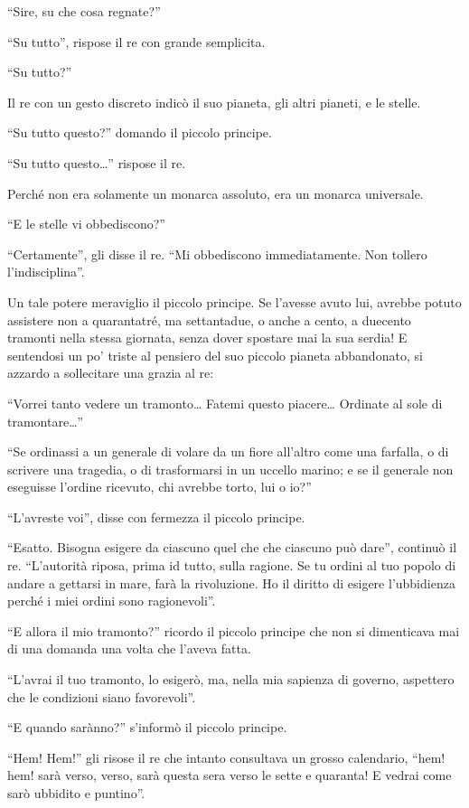\documentclass[11pt]{scrbook}
\begin{document}
``Sire, su che cosa regnate?''

``Su tutto'', rispose il re con grande semplicita.

``Su tutto?''

Il re con un gesto discreto indicò il suo pianeta, gli altri pianeti, e le stelle.

``Su tutto questo?'' domando il piccolo principe.

``Su tutto questo\ldots{}'' rispose il re.

Perché non era solamente un monarca assoluto, era un monarca universale.

``E le stelle vi obbediscono?''

``Certamente'', gli disse il re. ``Mi obbediscono immediatamente. Non tollero l'indisciplina''.

Un tale potere meraviglio il piccolo principe. Se l'avesse avuto lui, avrebbe potuto assistere non a quarantatré, ma settantadue, o anche a cento, a duecento tramonti nella stessa giornata, senza dover spostare mai la sua serdia! E sentendosi un po' triste al pensiero del suo piccolo pianeta abbandonato, si azzardo a sollecitare una grazia al re:

``Vorrei tanto vedere un tramonto\ldots{} Fatemi questo piacere\ldots{} Ordinate al sole di tramontare\ldots{}''

``Se ordinassi a un generale di volare da un fiore all'altro come una farfalla, o di scrivere una tragedia, o di trasformarsi in un uccello marino; e se il generale non eseguisse l'ordine ricevuto, chi avrebbe torto, lui o io?''

``L'avreste voi'', disse con fermezza il piccolo principe.

``Esatto. Bisogna esigere da ciascuno quel che che ciascuno può dare'', continuò il re. ``L'autorità riposa, prima id tutto, sulla ragione. Se tu ordini al tuo popolo di andare a gettarsi in mare, farà la rivoluzione. Ho il diritto di esigere l'ubbidienza perché i miei ordini sono ragionevoli''.

``E allora il mio tramonto?'' ricordo il piccolo principe che non si dimenticava mai di una domanda una volta che l'aveva fatta.

``L'avrai il tuo tramonto, lo esigerò, ma, nella mia sapienza di governo, aspettero che le condizioni siano favorevoli''.

``E quando sarànno?'' s'informò il piccolo principe.

``Hem! Hem!'' gli risose il re che intanto consultava un grosso calendario, ``hem! hem! sarà verso, verso, sarà questa sera verso le sette e quaranta! E vedrai come sarò ubbidito e puntino''.
\end{document}
